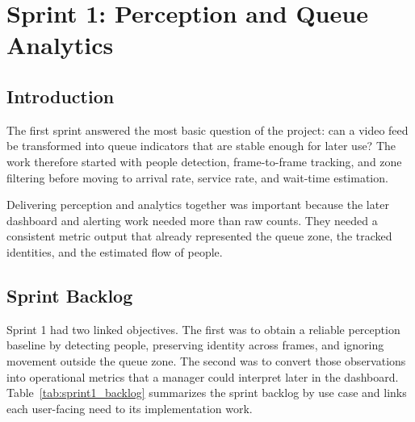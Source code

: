 \chapter{Sprint 1: Perception and Queue Analytics}
\chaptertoc

\clearpage
\section{Introduction}
The first sprint answered the most basic question of the project: can a video feed be transformed into queue indicators that are stable enough for later use? The work therefore started with people detection, frame-to-frame tracking, and zone filtering before moving to arrival rate, service rate, and wait-time estimation.

Delivering perception and analytics together was important because the later dashboard and alerting work needed more than raw counts. They needed a consistent metric output that already represented the queue zone, the tracked identities, and the estimated flow of people.

\section{Sprint Backlog}
Sprint 1 had two linked objectives. The first was to obtain a reliable perception baseline by detecting people, preserving identity across frames, and ignoring movement outside the queue zone. The second was to convert those observations into operational metrics that a manager could interpret later in the dashboard. Table~\ref{tab:sprint1_backlog} summarizes the sprint backlog by use case and links each user-facing need to its implementation work.

